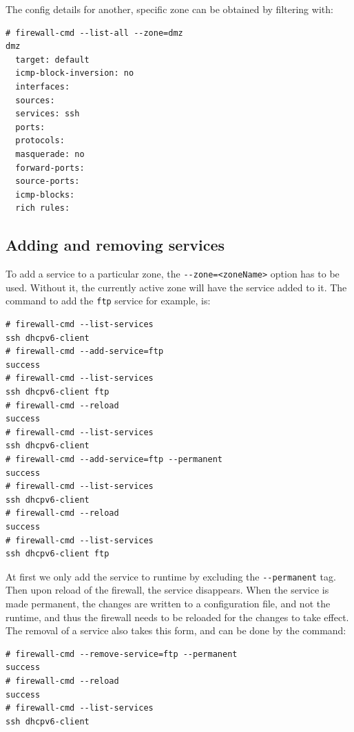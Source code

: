 \noindent
The config details for another, specific zone can be obtained by filtering with:

\vspace{-15pt}
\begin{verbatim}
# firewall-cmd --list-all --zone=dmz 
dmz
  target: default
  icmp-block-inversion: no
  interfaces: 
  sources: 
  services: ssh
  ports: 
  protocols: 
  masquerade: no
  forward-ports: 
  source-ports: 
  icmp-blocks: 
  rich rules: 
\end{verbatim}
\vspace{-10pt}	

\subsection{Adding and removing services}
To add a service to a particular zone, the \verb|--zone=<zoneName>| option has to be used. Without it, the currently active zone will have the service added to it. The command to add the \verb|ftp| service for example, is:

\vspace{-15pt}
\begin{verbatim}
# firewall-cmd --list-services 
ssh dhcpv6-client
# firewall-cmd --add-service=ftp 
success
# firewall-cmd --list-services 
ssh dhcpv6-client ftp
# firewall-cmd --reload 
success
# firewall-cmd --list-services 
ssh dhcpv6-client
# firewall-cmd --add-service=ftp --permanent 
success
# firewall-cmd --list-services 
ssh dhcpv6-client
# firewall-cmd --reload 
success
# firewall-cmd --list-services 
ssh dhcpv6-client ftp
\end{verbatim}
\vspace{-10pt}	

\noindent
At first we only add the service to runtime by excluding the \verb|--permanent| tag. Then upon reload of the firewall, the service disappears. When the service is made permanent, the changes are written to a configuration file, and not the runtime, and thus the firewall needs to be reloaded for the changes to take effect. The removal of a service also takes this form, and can be done by the command:

\vspace{-15pt}
\begin{verbatim}
# firewall-cmd --remove-service=ftp --permanent 
success
# firewall-cmd --reload 
success
# firewall-cmd --list-services 
ssh dhcpv6-client
\end{verbatim}
\vspace{-10pt}	

